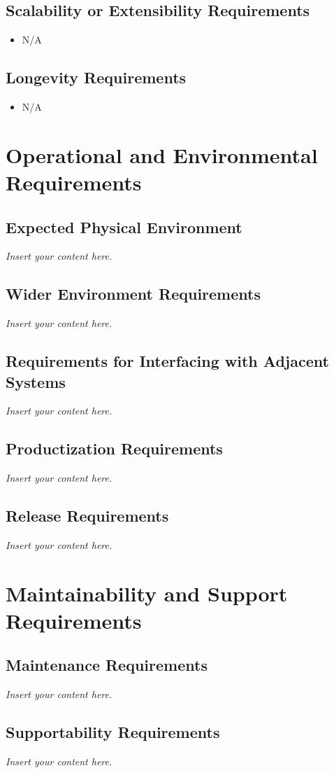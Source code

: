 \documentclass[12pt]{article}
\newcommand{\lips}{\textit{Insert your content here.}}
\begin{document}
\subsection{Scalability or Extensibility Requirements}
\begin{itemize}
  \item N/A
\end{itemize}
\subsection{Longevity Requirements}
\begin{itemize}
  \item N/A
\end{itemize}

\section{Operational and Environmental Requirements}
\subsection{Expected Physical Environment}
\lips
\subsection{Wider Environment Requirements}
\lips
\subsection{Requirements for Interfacing with Adjacent Systems}
\lips
\subsection{Productization Requirements}
\lips
\subsection{Release Requirements}
\lips

\section{Maintainability and Support Requirements}
\subsection{Maintenance Requirements}
\lips
\subsection{Supportability Requirements}
\lips
\end{document}
